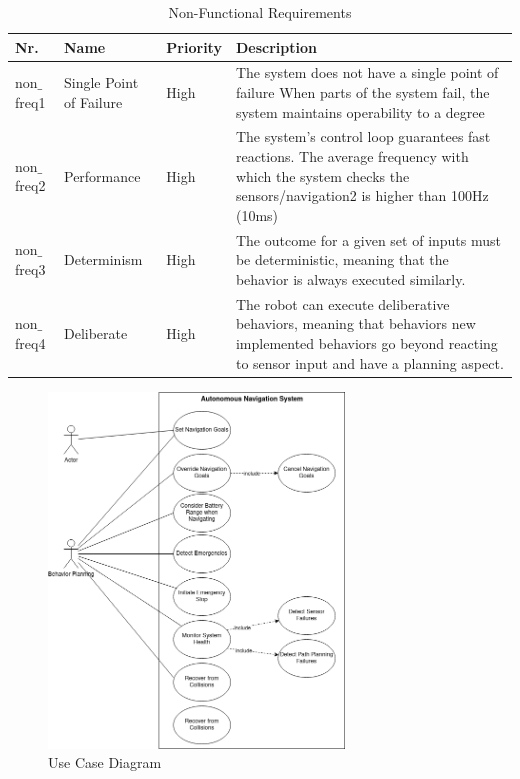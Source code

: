 \begin{table}[ht]
	\caption{Non-Functional Requirements}
	\label{tab:nonfn_req}
	\begin{tabular}{ | m{} | m{}| m{} | m{} |} 
  	\hline
  	\textbf{Nr.} & \textbf{Name} & \textbf{Priority} & \textbf{Description} \\ 
  	\hline
  	non$\_$freq1 & Single Point of Failure & High &  The system does not have a single point of failure	When parts of the system fail, the system maintains operability to a degree \\ 
  	\hline
  	non$\_$freq2 & Performance & High & The system's control loop guarantees fast reactions. The average frequency with which the system checks the sensors/navigation2 is higher than 100Hz (10ms) \\ 
  	\hline
  	non$\_$freq3 & Determinism & High & The outcome for a given set of inputs must be deterministic, meaning that the behavior is always executed similarly. \\
  	\hline
  	non$\_$freq4 & Deliberate & High & The robot can execute deliberative behaviors, meaning that behaviors new implemented behaviors go beyond reacting to sensor input and have a planning aspect. \\
  	\hline
	\end{tabular}
\end{table}

\begin{figure}[ht]   
	\includegraphics[width=0.7\textwidth]{images/use_case.png}
	\caption{Use Case Diagram}
	\label{fig:use_case}
\end{figure}


